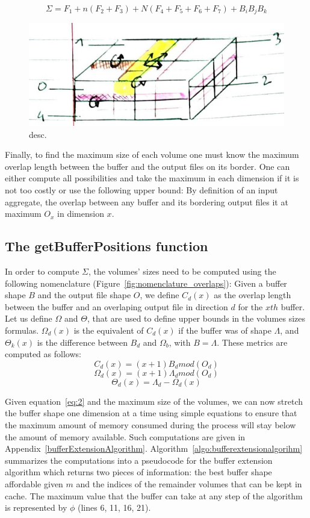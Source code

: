 \documentclass[conference]{IEEEtran}
\begin{document}
\begin{equation} \label{eq:2}
\Sigma = F_1 + n(F_2 + F_3) + N(F_4 + F_5 + F_6 + F_7) + B_iB_jB_k
\end{equation}

\begin{figure}[h]
\centering
\includegraphics[scale=0.3]{./figures/new/bufferextensionalgoformula.jpeg}
\caption{desc.}
\label{fig:calculmemoire}
\end{figure}

Finally, to find the maximum size of each volume one must know the maximum
overlap length between the buffer and the output files on its border. One can
either compute all possibilities and take the maximum in each dimension if it is
not too costly or use the following upper bound: By definition of an input
aggregate, the overlap between any buffer and its bordering output files it at
maximum $O_x$ in dimension $x$.

\subsection{The getBufferPositions function}

In order to compute $\Sigma$, the volumes' sizes need to be computed using the
following nomenclature (Figure~\ref{fig:nomenclature_overlaps}):
Given a buffer shape $B$ and the output file shape $O$, we define $C_d(x)$ as
the overlap length between the buffer and an overlaping output file in direction
$d$ for the $x{th}$ buffer. Let us define $\Omega$ and $\Theta$, that are used
to define upper bounds in the volumes sizes formulas. $\Omega_d(x)$ is the
equivalent of $C_d(x)$ if the buffer was of shape $\Lambda$, and $\Theta_k(x)$
is the difference between $B_d$ and $\Omega_b$, with $B=\Lambda$.
These metrics are computed as follows:
$$C_d(x) = (x+1)B_d mod(O_d)$$
$$\Omega_d(x) = (x+1)\Lambda_d mod(O_d)$$
$$\Theta_d(x) = \Lambda_d - \Omega_d(x)$$

Given equation~\ref{eq:2} and the maximum size of the volumes, we can now
stretch the buffer shape one dimension at a time using simple equations to ensure
that the maximum amount of memory consumed during the process will stay below the
amount of memory available. Such computations are given in
Appendix~\ref{bufferExtensionAlgorithm}.
Algorithm~\ref{algo:bufferextensionalgorihm} summarizes the computations into a
pseudocode for the buffer extension algorithm which returns two pieces of
information: the best buffer shape affordable given $m$ and the indices of the
remainder volumes that can be kept in cache. The maximum value that the buffer
can take at any step of the algorithm is represented by $\phi$ (lines 6, 11,
16, 21).
\end{document}

